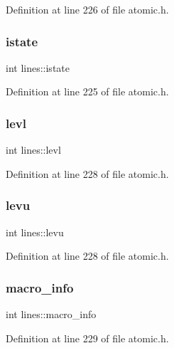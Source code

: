 Definition at line 226 of file atomic.\+h.

\mbox{\label{structlines_a5c97542291f487068cbb200bd31b210e}} 
\subsubsection{\texorpdfstring{istate}{istate}}
{\footnotesize\ttfamily int lines\+::istate}



Definition at line 225 of file atomic.\+h.

\mbox{\label{structlines_a9155121a84e08bc8bbc58e6b9f50d75b}} 
\subsubsection{\texorpdfstring{levl}{levl}}
{\footnotesize\ttfamily int lines\+::levl}



Definition at line 228 of file atomic.\+h.

\mbox{\label{structlines_a035daaa803e672f4242120f04f91eb46}} 
\subsubsection{\texorpdfstring{levu}{levu}}
{\footnotesize\ttfamily int lines\+::levu}



Definition at line 228 of file atomic.\+h.

\mbox{\label{structlines_a8bf1b13f22b24fc4fb517bb28dd775b8}} 
\subsubsection{\texorpdfstring{macro\+\_\+info}{macro\_info}}
{\footnotesize\ttfamily int lines\+::macro\+\_\+info}



Definition at line 229 of file atomic.\+h.

\mbox{\label{structlines_aa570454ab15c3c7d4324b54a254daf05}} 
